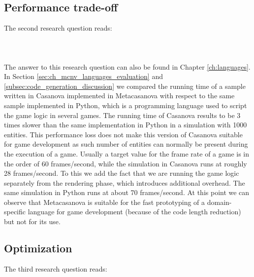 \subsection{Performance trade-off}
\label{subsec:ch_conclusion_rq2}
The second research question reads:\\\\
\\\\

The answer to this research question can also be found in Chapter \ref{ch:languages}. In Section  \ref{sec:ch_mcnv_languages_evaluation} and \ref{subsec:code_generation_discussion} we compared the running time of a sample written in Casanova implemented in Metacasanova with respect to the same sample implemented in Python, which is a programming language used to script the game logic in several games. The running time of Casanova results to be 3 times slower than the same implementation in Python in a simulation with 1000 entities. This performance loss does not make this version of Casanova suitable for game development as such number of entities can normally be present during the execution of a game. Usually a target value for the frame rate of a game is in the order of 60 frames/second, while the simulation in Casanova runs at roughly 28 frames/second. To this we add the fact that we are running the game logic separately from the rendering phase, which introduces additional overhead. The same simulation in Python runs at about 70 frames/second. At this point we can observe that Metacasanova is suitable for the fast prototyping of a domain-specific language for game development (because of the code length reduction) but not for its use.
\newpage

\subsection{Optimization}
\label{subsec:ch_conclusion_rq3}
The third research question reads:\\\\
\\\\


